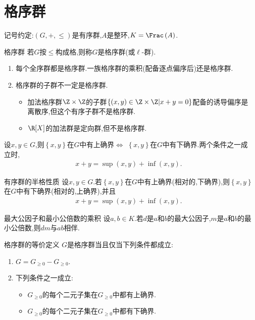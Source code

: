 \section{格序群}

记号约定:$\left(G,+,\leq\right)$是有序群,$A$是整环,$K=\Frac\left(A\right)$.

\begin{definition}{格序群}{}
	若$G$按$\leqslant$构成格,则称$G$是格序群(或$\ell$-群).
\end{definition}

\begin{remark}{}{}
	\begin{enumerate}
		\item 每个全序群都是格序群.一族格序群的乘积(配备逐点偏序后)还是格序群.
		\item 格序群的子群不一定是格序群.
		\begin{itemize}
			\item 加法格序群$\Z\times\Z$的子群$\left\{\left(x,y\right)\in\Z\times\Z\middle|x+y=0\right\}$配备的诱导偏序是离散序,但这个有序子群不是格序群.
			\item $\R[X]$的加法群是定向群,但不是格序群.
		\end{itemize}
	\end{enumerate}
\end{remark}

\begin{proposition}{}{}
	设$x,y\in G$,则$\left\{x,y\right\}$在$G$中有上确界$\iff$ $\left\{x,y\right\}$在$G$中有下确界.两个条件之一成立时,
	\begin{align*}
		x+y=\sup\left(x,y\right)+\inf\left(x,y\right).
	\end{align*}
\end{proposition}

\begin{proposition}{有序群的半格性质}{}
	设$x,y\in G$.若$\left\{x,y\right\}$在$G$中有上确界(相对的,下确界),则$\left\{x,y\right\}$在$G$中有下确界(相对的,上确界),并且
	\begin{align*}
		x+y=\sup\left(x,y\right)+\inf\left(x,y\right).
	\end{align*}
\end{proposition}

\begin{proposition}{最大公因子和最小公倍数的乘积}{}
	设$a,b\in K$.若$d$是$a$和$b$的最大公因子,$m$是$a$和$b$的最小公倍数,则$dm$与$ab$相伴.
\end{proposition}

\begin{proposition}{格序群的等价定义}{}
	$G$是格序群当且仅当下列条件都成立:
	\begin{enumerate}
		\item $G=G_{\geq 0}-G_{\geq 0}$.
		\item 下列条件之一成立:
		\begin{itemize}
			\item $G_{\geq 0}$的每个二元子集在$G_{\geq 0}$中都有上确界.
			\item $G_{\geq 0}$的每个二元子集在$G_{\geq 0}$中都有下确界.
		\end{itemize}
	\end{enumerate}
\end{proposition}
